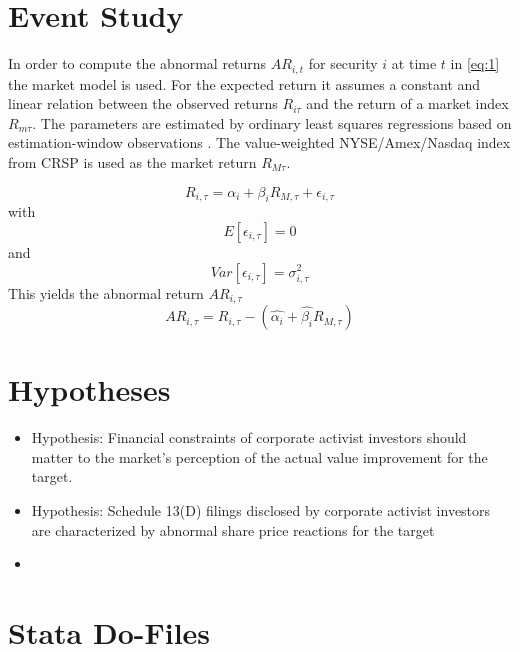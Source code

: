 \documentclass[12pt]{article}
\begin{document}
\begin{appendices}
\section{Event Study}

\noindent In order to compute the abnormal returns $AR_{i,t}$ for security $i$ at time $t$ in \eqref{eq:1} the market model is used. For the expected return it assumes a constant and linear relation between the observed returns $R_{i\tau}$ and the return of a market index $R_{m\tau}$. The parameters are estimated by ordinary least squares regressions based on estimation-window observations \citep[p.210]{Corrado2011}. The value-weighted NYSE/Amex/Nasdaq index from CRSP is used as the market return $R_{M\tau}$.

			\begin{equation*}
				R_{i,\tau}=\alpha_{i}+\beta_{i}R_{M,\tau}+\epsilon_{i,\tau}
			\end{equation*}
			with 
			\begin{equation*}
				E[\epsilon_{i,\tau}]=0
			\end{equation*}
			and 
			\begin{equation*}
				Var[\epsilon_{i,\tau}]=\sigma^2_{i,\tau}
			\end{equation*}
			This yields the abnormal return $AR_{i,\tau}$
			\begin{equation}
				AR_{i,\tau}=R_{i,\tau}-(\hat{\alpha_{i}}+\hat{\beta_{i}}R_{M,\tau})
			\end{equation}

\section{Hypotheses}

\begin{itemize}
\renewcommand\labelitemi{}
	\item {} Hypothesis: Financial constraints of corporate activist investors should matter to the market's perception of the actual value improvement for the target.
	\item {} Hypothesis: Schedule 13(D) filings disclosed by corporate activist investors are characterized by abnormal share price reactions for the target
	\item {}
\end{itemize}

\section{Stata Do-Files}
\end{appendices}
\printbibliography
 
\end{document}

